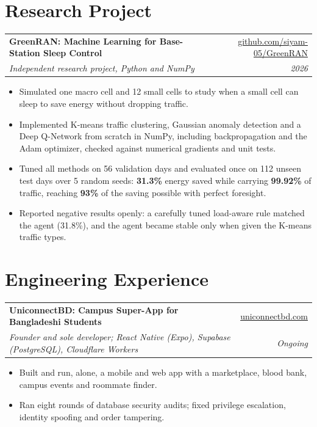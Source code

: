 \documentclass[10pt,letterpaper]{article}
\makeatletter
\newcommand{\entry}[4]{%
  \begin{tabularx}{\textwidth}{@{}X r@{}}
    \textbf{#1} & #2 \\
    \textit{#3} & {\color{muted}\textit{#4}} \\
  \end{tabularx}\vspace{1pt}}
\makeatother
\begin{document}
\section{Research Project}
\entry{GreenRAN: Machine Learning for Base-Station Sleep Control}{\href{https://github.com/siyam-05/GreenRAN}{github.com/siyam-05/GreenRAN}}
      {Independent research project, Python and NumPy}{2026}
\vspace{-1pt}
\begin{itemize}
  \item Simulated one macro cell and 12 small cells to study when a small cell can sleep to save energy without dropping traffic.
  \item Implemented K-means traffic clustering, Gaussian anomaly detection and a Deep Q-Network from scratch in NumPy, including
        backpropagation and the Adam optimizer, checked against numerical gradients and unit tests.
  \item Tuned all methods on 56 validation days and evaluated once on 112 unseen test days over 5 random seeds:
        \textbf{31.3\%} energy saved while carrying \textbf{99.92\%} of traffic, reaching \textbf{93\%} of the saving possible with perfect foresight.
  \item Reported negative results openly: a carefully tuned load-aware rule matched the agent (31.8\%), and the agent became stable
        only when given the K-means traffic types.
\end{itemize}

\section{Engineering Experience}
\entry{UniconnectBD: Campus Super-App for Bangladeshi Students}{\href{https://uniconnectbd.com}{uniconnectbd.com}}
      {Founder and sole developer; React Native (Expo), Supabase (PostgreSQL), Cloudflare Workers}{Ongoing}
\vspace{-1pt}
\begin{itemize}
  \item Built and run, alone, a mobile and web app with a marketplace, blood bank, campus events and roommate finder.
  \item Ran eight rounds of database security audits; fixed privilege escalation, identity spoofing and order tampering.
\end{itemize}

\end{document}
